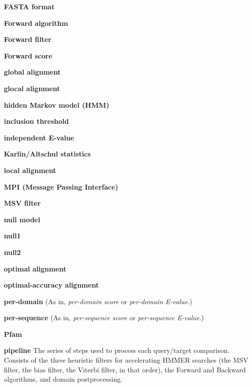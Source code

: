 \begin{wideitem}
\item[\textbf{FASTA format}]

\item[\textbf{Forward algorithm}]

\item[\textbf{Forward filter}]

\item[\textbf{Forward score}]

\item[\textbf{global alignment}]

\item[\textbf{glocal alignment}]

\item[\textbf{hidden Markov model (HMM)}]

\item[\textbf{inclusion threshold}]

\item[\textbf{independent E-value}]

\item[\textbf{Karlin/Altschul statistics}]

\item[\textbf{local alignment}]

\item[\textbf{MPI (Message Passing Interface)}]

\item[\textbf{MSV filter}]

\item[\textbf{null model}]

\item[\textbf{null1}]

\item[\textbf{null2}]

\item[\textbf{optimal alignment}]

\item[\textbf{optimal-accuracy alignment}]

\item[\textbf{per-domain}] (As in, \emph{per-domain score} or
  \emph{per-domain E-value}.)

\item[\textbf{per-sequence}] (As in, \emph{per-sequence score} or
  \emph{per-sequence E-value}.)

\item[\textbf{Pfam}]

\item[\textbf{pipeline}] The series of steps used to process each
query/target comparison. Consists of the three heuristic filters for
accelerating HMMER searches (the MSV filter, the bias filter, the
Viterbi filter, in that order), the Forward and Backward algorithms,
and domain postprocessing.


\end{wideitem}
